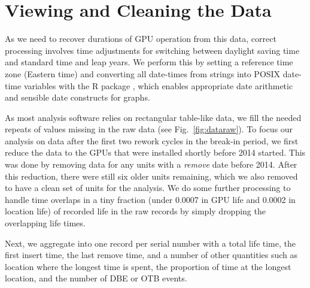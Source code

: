 \section{Viewing and Cleaning the Data}
\label{section:dataclean}
As we need to recover durations of GPU operation from this data, correct
processing involves time adjustments for switching between daylight
saving time and standard time and leap years. We perform this by
setting a reference time zone (Eastern time) and converting all
date-times from strings into POSIX date-time variables with the R
 package \cite{lubridate}, which enables appropriate
date arithmetic and sensible date constructs for graphs.

As most analysis software relies on rectangular table-like data, we
fill the needed repeats of values missing in the raw data (see
Fig.~\ref{fig:dataraw}). To focus our analysis on data after the first
two rework cycles in the break-in period, we first reduce the data to
the GPUs that were installed shortly before 2014 started. This was
done by removing data for any units with a {\em remove} date before
2014. After this reduction, there were still six older units
remaining, which we also removed to have a clean set of units for the
analysis. We do some further processing to handle time overlaps in a
tiny fraction (under 0.0007 in GPU life and 0.0002 in location life)
of recorded life in the raw records by simply dropping the overlapping
life times. 

Next, we aggregate into one record per serial number with a total life
time, the first insert time, the last remove time, and a number of
other quantities such as location where the longest time is spent, the
proportion of time at the longest location, and the number of DBE or
OTB events.

